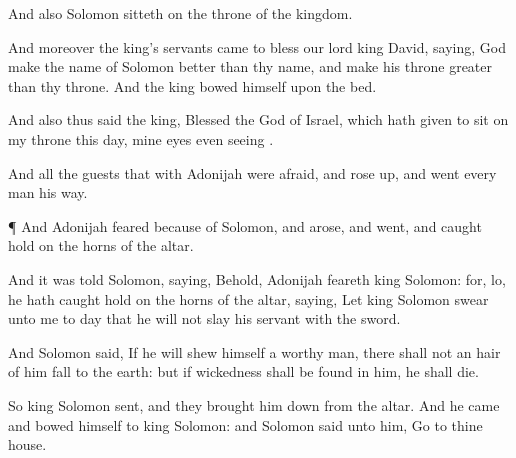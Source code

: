 {And also
Solomon
sitteth on the
throne of the
kingdom.

And moreover the
king’s
servants
came to
bless our
lord
king
David,
saying,
God make the
name of
Solomon
better than thy
name, and
make his
throne
greater than thy
throne. And the
king
bowed himself upon the
bed.

And also thus
said the
king,
Blessed
{} the
{}
God of
Israel, which hath
given
{} to
sit on my
throne this
day, mine
eyes even
seeing
{}.

And all the
guests that
{} with
Adonijah were
afraid, and rose
up, and
went every
man his
way.


\par }{\PP {}¶ And
Adonijah
feared
because of
Solomon, and
arose, and
went, and caught
hold on the
horns of the
altar.

And it was
told
Solomon,
saying, Behold,
Adonijah
feareth
king
Solomon: for, lo, he hath caught
hold on the
horns of the
altar,
saying, Let
king
Solomon
swear unto me to
day that he will not
slay his
servant with the
sword.

And
Solomon
said, If he will shew himself a
worthy
man, there shall not an
hair of him
fall to the
earth: but if
wickedness shall be
found in him, he shall
die.

So
king
Solomon
sent, and they brought him
down from the
altar. And he
came and
bowed himself to
king
Solomon: and
Solomon
said unto him,
Go to thine
house.




\par }
